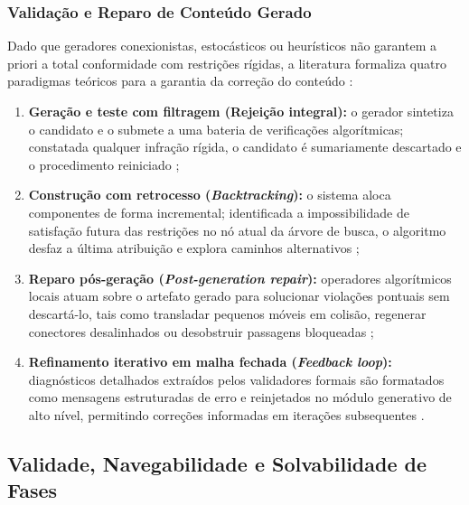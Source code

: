 \subsubsection{Validação e Reparo de Conteúdo Gerado}
\label{sec:validacao_reparo}

Dado que geradores conexionistas, estocásticos ou heurísticos não garantem a priori a total conformidade com restrições rígidas, a literatura formaliza quatro paradigmas teóricos para a garantia da correção do conteúdo \cite{pcgbook, summerville2018procedural, maleki2024procedural, xu2025databasedrivenframework3dlevel}:
\begin{enumerate}
    \item \textbf{Geração e teste com filtragem (Rejeição integral):} o gerador sintetiza o candidato e o submete a uma bateria de verificações algorítmicas; constatada qualquer infração rígida, o candidato é sumariamente descartado e o procedimento reiniciado \cite{pcgbook, maleki2024procedural};
    \item \textbf{Construção com retrocesso (\textit{Backtracking}):} o sistema aloca componentes de forma incremental; identificada a impossibilidade de satisfação futura das restrições no nó atual da árvore de busca, o algoritmo desfaz a última atribuição e explora caminhos alternativos \cite{tanagra, linden2014dungeons, russell2021artificial};
    \item \textbf{Reparo pós-geração (\textit{Post-generation repair}):} operadores algorítmicos locais atuam sobre o artefato gerado para solucionar violações pontuais sem descartá-lo, tais como transladar pequenos móveis em colisão, regenerar conectores desalinhados ou desobstruir passagens bloqueadas \cite{summerville2018procedural, sun2024roomplanner, xu2025databasedrivenframework3dlevel};
    \item \textbf{Refinamento iterativo em malha fechada (\textit{Feedback loop}):} diagnósticos detalhados extraídos pelos validadores formais são formatados como mensagens estruturadas de erro e reinjetados no módulo generativo de alto nível, permitindo correções informadas em iterações subsequentes \cite{hu2024scenecraft, nasir2024word2worldgeneratingstoriesworlds, xu2025constraint, her2025zeroshot3dmapgeneration}.
\end{enumerate}

\subsection{Validade, Navegabilidade e Solvabilidade de Fases}
\label{sec:validade_navegabilidade_solvabilidade}

